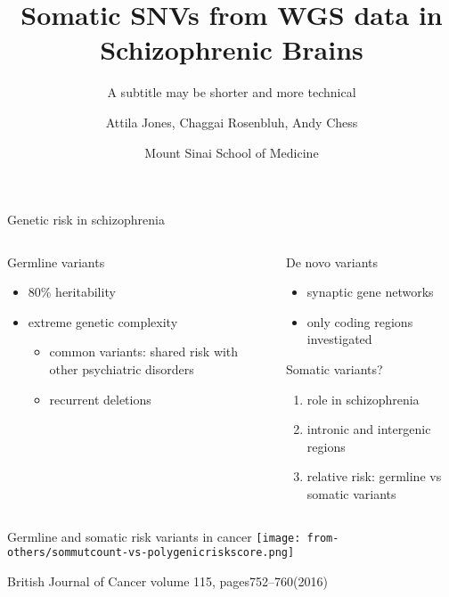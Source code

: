 \documentclass{beamer}
\title{Somatic SNVs from WGS data in Schizophrenic Brains}
\subtitle{A subtitle may be shorter and more technical}
\author{Attila Jones, Chaggai Rosenbluh, Andy Chess}
\date{Mount Sinai School of Medicine}
\begin{document}
\maketitle


\begin{frame}{Genetic risk in schizophrenia}
\begin{columns}[t]
\begin{column}{0.5\textwidth}
Germline variants
\begin{itemize}
\item 80\% heritability
\item extreme genetic complexity
\begin{itemize}
\item common variants: shared risk with other psychiatric disorders
\item recurrent deletions%
\end{itemize}
\end{itemize}
\end{column}
\begin{column}{0.5\textwidth}
De novo variants
\begin{itemize}
        \item synaptic gene networks
	\item only coding regions investigated%
\end{itemize}
\vfill
Somatic variants?
\begin{enumerate}
\item role in schizophrenia
\item intronic and intergenic regions
\item relative risk: germline vs somatic variants	
\end{enumerate}
\end{column}
\end{columns}
\end{frame}

\begin{frame}{Germline and somatic risk variants in cancer}
\texttt{[image: from-others/sommutcount-vs-polygenicriskscore.png]}

\tiny
British Journal of Cancer volume 115, pages752–760(2016)
\end{frame}
\end{document}
